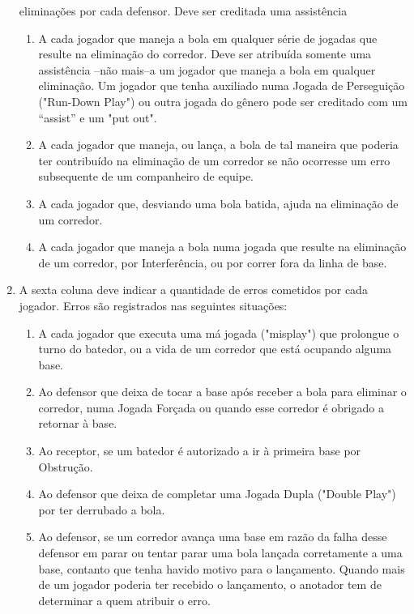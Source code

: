 \begin{multicols}{2}
\begin{enumerate}[label= \arabic*)]
		eliminações por cada defensor. Deve ser creditada uma assistência
		\begin{enumerate}[label= (\alph*)]
			\item A cada jogador que maneja a bola em qualquer série de jogadas que resulte na 		eliminação do corredor. Deve ser atribuída somente uma assistência –não mais–a um 		jogador que maneja a bola em qualquer eliminação. Um jogador que tenha auxiliado 		numa Jogada de Perseguição ("Run-Down Play") ou outra jogada do gênero pode ser 		creditado com um “assist” e um "put out".
			\item A cada jogador que maneja, ou lança, a bola de tal maneira que poderia ter 		contribuído na eliminação de um corredor se não ocorresse um erro subsequente de 		um companheiro de equipe.
			\item A cada jogador que, desviando uma bola batida, ajuda na eliminação de um
			corredor.
			\item A cada jogador que maneja a bola numa jogada que resulte na eliminação de um
			corredor, por Interferência, ou por correr fora da linha de base.
		\end{enumerate}

		\item A sexta coluna deve indicar a quantidade de erros cometidos por cada jogador. Erros
		são registrados nas seguintes situações:
		\begin{enumerate}[label= (\alph*)]
			\item A cada jogador que executa uma má jogada ("misplay") que prolongue o turno do
			batedor, ou a vida de um corredor que está ocupando alguma base.
			\item Ao defensor que deixa de tocar a base após receber a bola para eliminar o
			corredor, numa Jogada Forçada ou quando esse corredor é obrigado a retornar à base.
			\item Ao receptor, se um batedor é autorizado a ir à primeira base por Obstrução.
			\item Ao defensor que deixa de completar uma Jogada Dupla ("Double Play") por ter
			derrubado a bola.
			\item Ao defensor, se um corredor avança uma base em razão da falha desse defensor
			em parar ou tentar parar uma bola lançada corretamente a uma base, contanto que tenha havido motivo para o lançamento. Quando mais de um jogador poderia ter
			recebido o lançamento, o anotador tem de determinar a quem atribuir o erro.
		\end{enumerate}
	\end{enumerate}
\end{multicols}

